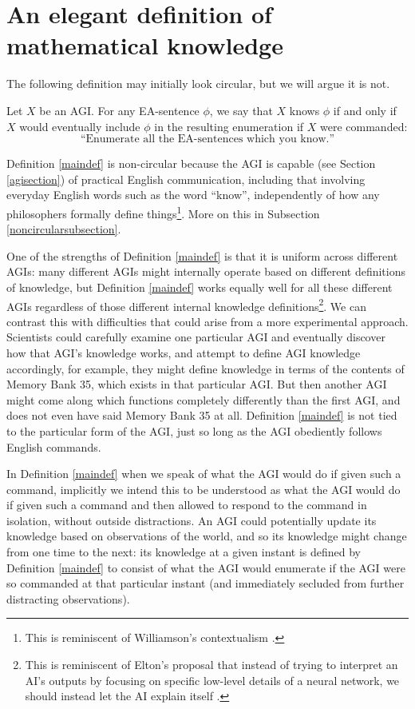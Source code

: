 \documentclass[runningheads]{llncs}
\begin{document}
\section{An elegant definition of mathematical knowledge}
\label{mainsection}

The following definition may initially look circular, but we will argue
it is not.

\begin{definition}
\label{maindef}
  Let $X$ be an AGI.
  For any EA-sentence $\phi$, we say that $X$
  knows $\phi$ if and only
  if $X$ would eventually include $\phi$ in the resulting enumeration
  if $X$ were commanded:
  \[
  \text{``Enumerate all the EA-sentences which you know.''}
  \]
\end{definition}

Definition \ref{maindef} is non-circular because
the AGI is capable (see Section \ref{agisection}) of practical English
communication, including that involving everyday English words such as
the word ``know'', independently of how any philosophers formally
define things\footnote{This is reminiscent of
Williamson's contextualism \cite{williamson2005knowledge}.}.
More on this in Subsection \ref{noncircularsubsection}.


One of the strengths of Definition \ref{maindef} is that it is uniform across
different AGIs: many different AGIs might internally operate based on different
definitions of knowledge, but Definition \ref{maindef} works equally well for
all these different AGIs regardless of those different internal knowledge
definitions\footnote{This is reminiscent of Elton's proposal that instead of
trying to interpret an AI's outputs by focusing on specific low-level details
of a neural network, we should instead let the AI explain itself \cite{elton}.}.
We can contrast this with difficulties that could arise from a more experimental
approach. Scientists could carefully examine one particular AGI and eventually
discover how that AGI's knowledge works, and attempt to define AGI knowledge
accordingly, for example, they might define knowledge in terms of the contents
of Memory Bank 35, which exists in that particular AGI. But then another AGI
might come along which functions completely differently than the first AGI, and
does not even have said Memory Bank 35 at all. Definition \ref{maindef} is
not tied to the particular form of the AGI, just so long as the AGI obediently
follows English commands.

\begin{remark}
In Definition \ref{maindef} when we speak of what the AGI would do
if given such a command, implicitly we intend this to be understood as what
the AGI would do if given such a command and then allowed to respond to the
command in isolation, without outside distractions. An AGI could potentially
update its knowledge based on observations of the world, and so its knowledge
might change from one time to the next: its knowledge at a given instant is defined
by Definition \ref{maindef} to consist of what the AGI would enumerate if the
AGI were so commanded at that particular instant (and immediately secluded from
further distracting observations).
\end{remark}
\end{document}
